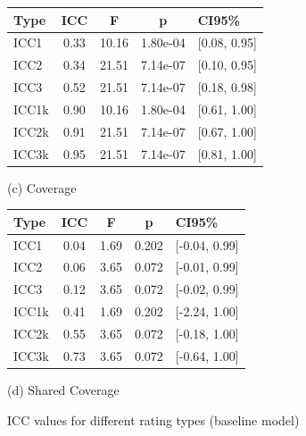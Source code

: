 \begin{figure}[h]
    \vspace{1em}
    \begin{minipage}{.5\textwidth}
        \centering
        \begin{tabular}{lcccl}
            \hline
            \textbf{Type} & \textbf{ICC} & \textbf{F} & \textbf{p} & \textbf{CI95\%} \\
            \hline
            ICC1          & 0.33         & 10.16      & 1.80e-04   & [0.08, 0.95]    \\
            ICC2          & 0.34         & 21.51      & 7.14e-07   & [0.10, 0.95]    \\
            ICC3          & 0.52         & 21.51      & 7.14e-07   & [0.18, 0.98]    \\
            ICC1k         & 0.90         & 10.16      & 1.80e-04   & [0.61, 1.00]    \\
            ICC2k         & 0.91         & 21.51      & 7.14e-07   & [0.67, 1.00]    \\
            ICC3k         & 0.95         & 21.51      & 7.14e-07   & [0.81, 1.00]    \\
            \hline
        \end{tabular}
        \caption*{(c) Coverage}
    \end{minipage}%
    \begin{minipage}{.5\textwidth}
        \centering
        \begin{tabular}{lcccl}
            \hline
            \textbf{Type} & \textbf{ICC} & \textbf{F} & \textbf{p} & \textbf{CI95\%} \\
            \hline
            ICC1          & 0.04         & 1.69       & 0.202      & [-0.04, 0.99]   \\
            ICC2          & 0.06         & 3.65       & 0.072      & [-0.01, 0.99]   \\
            ICC3          & 0.12         & 3.65       & 0.072      & [-0.02, 0.99]   \\
            ICC1k         & 0.41         & 1.69       & 0.202      & [-2.24, 1.00]   \\
            ICC2k         & 0.55         & 3.65       & 0.072      & [-0.18, 1.00]   \\
            ICC3k         & 0.73         & 3.65       & 0.072      & [-0.64, 1.00]   \\
            \hline
        \end{tabular}
        \caption*{(d) Shared Coverage}
    \end{minipage}
    \caption{ICC values for different rating types (baseline model)}
    \label{fig:icc_baseline}
\end{figure}

